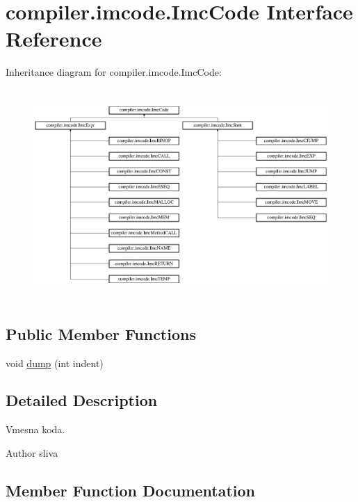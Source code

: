\hypertarget{interfacecompiler_1_1imcode_1_1_imc_code}{}\section{compiler.\+imcode.\+Imc\+Code Interface Reference}
\label{interfacecompiler_1_1imcode_1_1_imc_code}
Inheritance diagram for compiler.\+imcode.\+Imc\+Code\+:\begin{figure}[H]
\begin{center}
\leavevmode
\includegraphics[height=8.038278cm]{interfacecompiler_1_1imcode_1_1_imc_code}
\end{center}
\end{figure}
\subsection*{Public Member Functions}
\begin{DoxyCompactItemize}
\item 
void \hyperlink{interfacecompiler_1_1imcode_1_1_imc_code_a26451dea2ab4dbd7054ac33f4c6d71fe}{dump} (int indent)
\end{DoxyCompactItemize}


\subsection{Detailed Description}
Vmesna koda.

\begin{DoxyAuthor}{Author}
sliva 
\end{DoxyAuthor}


\subsection{Member Function Documentation}
\mbox{\label{interfacecompiler_1_1imcode_1_1_imc_code_a26451dea2ab4dbd7054ac33f4c6d71fe}} 
